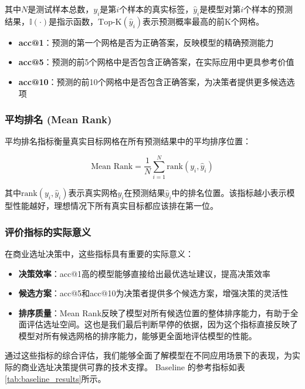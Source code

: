 \documentclass{article}
\begin{document}
其中$N$是测试样本总数，$y_i$是第$i$个样本的真实标签，$\hat{y}_i$是模型对第$i$个样本的预测结果，$\mathbb{I}(\cdot)$是指示函数，$\text{Top-K}(\hat{y}_i)$表示预测概率最高的前K个网格。

\begin{itemize}
\item \textbf{acc@1}：预测的第一个网格是否为正确答案，反映模型的精确预测能力
\item \textbf{acc@5}：预测的前5个网格中是否包含正确答案，在实际应用中更具参考价值
\item \textbf{acc@10}：预测的前10个网格中是否包含正确答案，为决策者提供更多候选选项
\end{itemize}

\subsubsection{平均排名 (Mean Rank)}

平均排名指标衡量真实目标网格在所有预测结果中的平均排序位置：

\begin{equation}
\text{Mean Rank} = \frac{1}{N} \sum_{i=1}^{N} \text{rank}(y_i, \hat{y}_i)
\end{equation}

其中$\text{rank}(y_i, \hat{y}_i)$表示真实网格$y_i$在预测结果$\hat{y}_i$中的排名位置。该指标越小表示模型性能越好，理想情况下所有真实目标都应该排在第一位。

\subsubsection{评价指标的实际意义}

在商业选址决策中，这些指标具有重要的实际意义：

\begin{itemize}
\item \textbf{决策效率}：acc@1高的模型能够直接给出最优选址建议，提高决策效率
\item \textbf{候选方案}：acc@5和acc@10为决策者提供多个候选方案，增强决策的灵活性
\item \textbf{排序质量}：Mean Rank反映了模型对所有候选位置的整体排序能力，有助于全面评估选址空间。这也是我们最后判断早停的依据，因为这个指标直接反映了模型对所有候选网格的排序能力，能够更全面地评估模型的性能。
\end{itemize}

通过这些指标的综合评估，我们能够全面了解模型在不同应用场景下的表现，为实际的商业选址决策提供可靠的技术支撑。
Baseline 的参考指标如表\ref{tab:baseline_results}所示。
\end{document}
